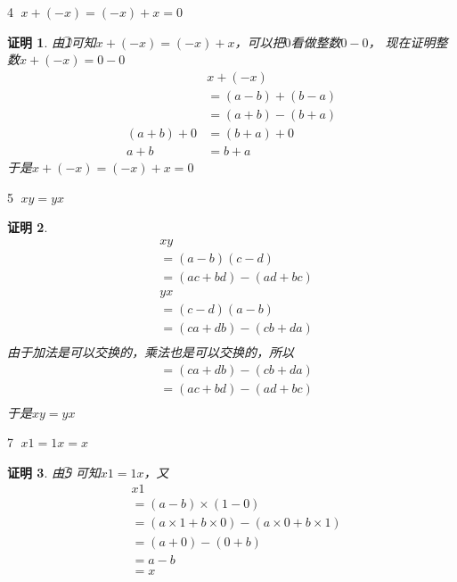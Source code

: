 \documentclass{article}
\theoremstyle{mystyle}
\theoremstyle{zproofstyle}
\newtheorem*{zproof}{证明}
\begin{document}
\textcircled{4} $x+(-x)=(-x)+x=0$

\begin{zproof}
  由\textcircled{1}可知$x+(-x)=(-x)+x$，可以把$0$看做整数$0-0$，
  现在证明整数$x+(-x)=0-0$
  \begin{align*}
              & x + (-x)        \\
              & = (a-b) + (b-a) \\
              & = (a+b) - (b+a) \\
    (a+b) + 0 & = (b+a) + 0     \\
    a + b     & = b + a
  \end{align*}
  于是$x+(-x)=(-x)+x=0$
\end{zproof}

\textcircled{5} $xy=yx$

\begin{zproof}
  \begin{align*}
     & xy                  \\
     & = (a-b)(c-d)        \\
     & = (ac+bd) - (ad+bc) \\
     & yx                  \\
     & = (c-d)(a-b)        \\
     & = (ca+db) - (cb+da) \\
  \end{align*}
  由于加法是可以交换的，乘法也是可以交换的，所以
  \begin{align*}
     & = (ca+db) - (cb+da) \\
     & = (ac+bd) - (ad+bc) \\
  \end{align*}
  于是$xy = yx$
\end{zproof}

\textcircled{7} $x1=1x=x$

\begin{zproof}
  由\textcircled{5} 可知$x1=1x$，又
  \begin{align*}
     & x1                                                      \\
     & = (a-b) \times (1-0)                                    \\
     & = (a \times 1 + b \times 0) - (a \times 0 + b \times 1) \\
     & = (a + 0) - (0 + b)                                     \\
     & = a - b                                                 \\
     & = x                                                     \\
  \end{align*}
\end{zproof}
\end{document}
